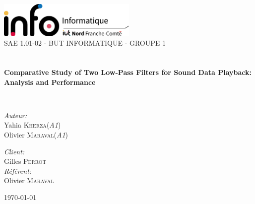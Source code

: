 \begin{titlepage}
\begin{center}

\includegraphics[width=0.5\textwidth]{./images/InfoLogoQuadriH.png}~\\[1cm]

\textsc{\LARGE SAE 1.01-02 - BUT INFORMATIQUE - GROUPE 1 }\\[1.5cm]

\textsc{\Large }\\[0.5cm]

\HRule \\[0.4cm]

{\huge \bfseries Comparative Study of Two Low-Pass Filters for Sound Data Playback: Analysis and Performance\\[0.4cm] }

\HRule \\[1.5cm]

\begin{minipage}{0.4\textwidth}
\begin{flushleft} \large
\emph{Auteur:}\\
Yahia \textsc{Kherza}(\textit{A1})\\
Olivier \textsc{Maraval}(\textit{A1})\\
\end{flushleft}
\end{minipage}
\begin{minipage}{0.4\textwidth}
\begin{flushright} \large
\emph{Client:} \\
Gilles \textsc{Perrot}\\
\emph{Référent:} \\
Olivier \textsc{Maraval}
\end{flushright}
\end{minipage}

\vfill

{\large \today}

\end{center}
\end{titlepage}